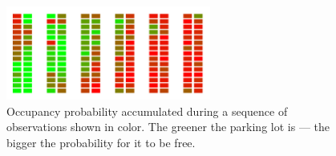 \begin{figure}[t]
    \begin{center}
        \includegraphics[width=0.6\textwidth]{pictures/parking_lots.png}
    \end{center}
    \caption{Occupancy probability accumulated during a sequence of observations shown in color. The greener the parking lot is --- the bigger the probability for it to be free.}
    \label{fig:occupancy_accumulated}
\end{figure}


